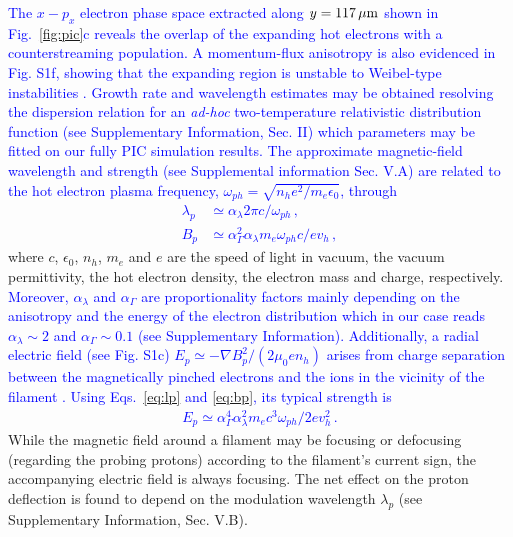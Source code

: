 \documentclass[aps,twocolumn,showpacs,superscriptaddress]{revtex4}
\begin{document}
\textcolor{blue}{The $x-p_x$ electron phase space extracted along $y = 117\,\rm \mu m$ shown in Fig.~\ref{fig:pic}c reveals the overlap of the expanding hot electrons  with a counterstreaming population. A momentum-flux anisotropy is also evidenced in Fig. S1f, showing that the expanding region  is unstable to Weibel-type instabilities \cite{POP_Ren_2006, PRL_Gode_2017}. Growth rate and wavelength estimates may be obtained resolving the dispersion relation  for an \emph{ad-hoc} two-temperature relativistic distribution function (see Supplementary Information, Sec. II) which parameters may be fitted on our fully PIC simulation results.
The approximate magnetic-field wavelength and strength (see Supplemental information Sec. V.A) are related to the hot electron plasma frequency, $\omega_{ph}=\sqrt{n_h e^2/m_e \epsilon_0}$, through 
\begin{align}
  \lambda_p &\simeq \alpha_\lambda 2\pi c/\omega_{ph} \label{eq:lp}  \,,\\
  B_p &\simeq \alpha_\Gamma^2\alpha_\lambda m_e \omega_{ph}c/ ev_h \label{eq:bp} \,, 
\end{align}}
where $c$, $\epsilon_0$, $n_h$, $m_e$ and $e$ are the speed of light in vacuum, the vacuum permittivity, the hot electron density, the electron mass and  charge, respectively. \textcolor{blue}{Moreover, $\alpha_\lambda $ and $\alpha_\Gamma $ are proportionality factors mainly depending on the anisotropy and the energy of the  electron distribution  which  in our case reads $\alpha_\lambda\sim 2 $ and $\alpha_\Gamma\sim 0.1 $ (see Supplementary Information).
Additionally, a radial electric field (see Fig. S1c) $E_p \simeq - \nabla B_p^2/(2 \mu_0e n_h)$ arises from charge separation between the magnetically pinched electrons and the ions in the vicinity of the filament \cite{POP_Dieckmann_2009, POP_Bret_Gremillet_2010}. 
Using Eqs.~\eqref{eq:lp} and \eqref{eq:bp}, its typical strength is 
\begin{align} 
  E_p \simeq \alpha_\Gamma^4  \alpha_\lambda^2 m_ec^3\omega_{ph}/2ev_h^2 \label{eq:ep} \, .
\end{align}}
While the magnetic field around a filament may be focusing or defocusing (regarding the probing protons) according to the filament's current sign, the accompanying electric field is always focusing. The net effect on the proton deflection is found to depend on the modulation wavelength $\lambda_p$ (see Supplementary Information, Sec. V.B).
\end{document}

